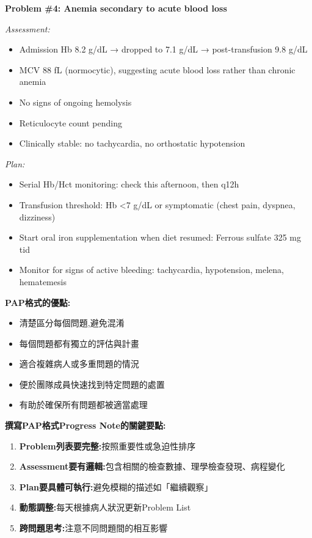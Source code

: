 \documentclass[12pt,a4paper]{article}
\newcommand{\note}[1]{
    \par
    \noindent
    \begin{tcolorbox}[
        colback=emergency_blue!5!white,
        colframe=emergency_blue,
        title=\textbf{重點提醒},
        fonttitle=\bfseries,
        boxrule=0.5pt,
        arc=3pt,
        left=6pt,
        right=6pt,
        top=6pt,
        bottom=6pt
    ]
    #1
    \end{tcolorbox}
}
\begin{document}
\begin{mdframed}[linecolor=emergency_gray,linewidth=1pt]
\textbf{Problem \#4: Anemia secondary to acute blood loss}

\textit{Assessment:}
\begin{itemize}[nosep,leftmargin=15pt]
\item Admission Hb 8.2 g/dL → dropped to 7.1 g/dL → post-transfusion 9.8 g/dL
\item MCV 88 fL (normocytic), suggesting acute blood loss rather than chronic anemia
\item No signs of ongoing hemolysis
\item Reticulocyte count pending
\item Clinically stable: no tachycardia, no orthostatic hypotension
\end{itemize}

\textit{Plan:}
\begin{itemize}[nosep,leftmargin=15pt]
\item Serial Hb/Hct monitoring: check this afternoon, then q12h
\item Transfusion threshold: Hb <7 g/dL or symptomatic (chest pain, dyspnea, dizziness)
\item Start oral iron supplementation when diet resumed: Ferrous sulfate 325 mg tid
\item Monitor for signs of active bleeding: tachycardia, hypotension, melena, hematemesis
\end{itemize}

\end{mdframed}

\note{
\textbf{PAP格式的優點:}
\begin{itemize}[nosep]
\item 清楚區分每個問題,避免混淆
\item 每個問題都有獨立的評估與計畫
\item 適合複雜病人或多重問題的情況
\item 便於團隊成員快速找到特定問題的處置
\item 有助於確保所有問題都被適當處理
\end{itemize}
}

\begin{importantbox}
\textbf{撰寫PAP格式Progress Note的關鍵要點:}
\begin{enumerate}
\item \textbf{Problem列表要完整:}按照重要性或急迫性排序
\item \textbf{Assessment要有邏輯:}包含相關的檢查數據、理學檢查發現、病程變化
\item \textbf{Plan要具體可執行:}避免模糊的描述如「繼續觀察」
\item \textbf{動態調整:}每天根據病人狀況更新Problem List
\item \textbf{跨問題思考:}注意不同問題間的相互影響
\end{enumerate}
\end{importantbox}
\end{document}
